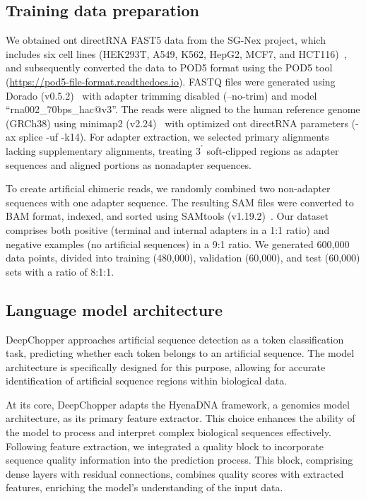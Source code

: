 \documentclass[pdflatex,sn-nature, lineno]{sn-jnl}%
\theoremstyle{thmstyleone}%
\theoremstyle{thmstyletwo}%
\theoremstyle{thmstylethree}%
\begin{document}
\subsection{Training data preparation}\label{ssec:data}

We obtained \gls{ont} directRNA FAST5 data from the SG-Nex project, which includes six cell lines (HEK293T, A549, K562, HepG2, MCF7, and HCT116)~\cite{chen2021systematic}, and subsequently converted the data to POD5 format using the POD5 tool (\url{https://pod5-file-format.readthedocs.io}).
FASTQ files were generated using Dorado (v0.5.2)~\cite{dorado2023} with adapter trimming disabled (--no-trim) and  model ``rna002\_70bps\_hac@v3''.
The reads were aligned to the human reference genome (GRCh38) using minimap2 (v2.24)~\cite{li2018minimap2} with optimized \gls{ont} directRNA parameters (-ax splice -uf -k14).
For adapter extraction, we selected primary alignments lacking supplementary alignments, treating \(3^{\prime}\)  soft-clipped regions as adapter sequences and aligned portions as nonadapter sequences.

To create artificial chimeric reads, we randomly combined two non-adapter sequences with one adapter sequence.
The resulting SAM files were converted to BAM format, indexed, and sorted using SAMtools (v1.19.2)~\cite{li2009sequence}.
Our dataset comprises both positive (terminal and internal adapters in a 1:1 ratio) and negative examples (no artificial sequences) in a 9:1 ratio.
We generated 600,000 data points, divided into training (480,000), validation (60,000), and test (60,000) sets with a ratio of 8:1:1.

\subsection{Language model architecture}\label{ssec:lm}

DeepChopper approaches artificial sequence detection as a token classification task, predicting whether each token belongs to an artificial sequence.
The model architecture is specifically designed for this purpose, allowing for accurate identification of artificial sequence regions within biological data.

At its core, DeepChopper adapts the HyenaDNA framework, a genomics model architecture, as its primary feature extractor.
This choice enhances the ability of the model to process and interpret complex biological sequences effectively.
Following feature extraction, we integrated a quality block to incorporate sequence quality information into the prediction process.
This block, comprising dense layers with residual connections, combines quality scores with extracted features, enriching the model's understanding of the input data.
\end{document}
